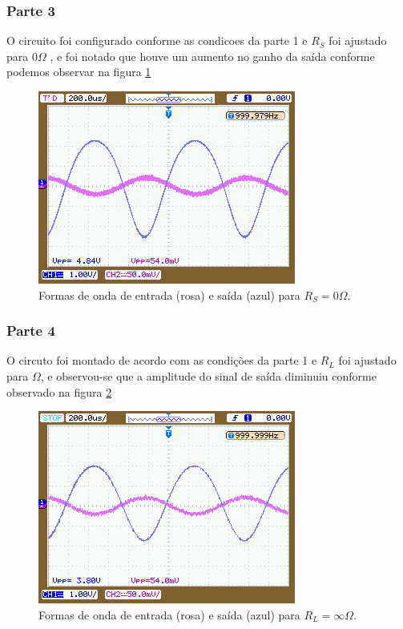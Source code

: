 \documentclass{abntex2}
\begin{document}
\subsubsection{Parte 3}

  O circuito foi configurado conforme as condicoes da parte 1 e $R_S$ foi ajustado para 0$\Omega$ , e foi notado que houve um aumento no ganho da saída conforme podemos observar na figura \ref{fig:saida_rs}

  \begin{figure}[h]
    \centering
    \includegraphics[scale = 0.5]{saida_rs.png}
    \caption{Formas de onda de entrada (rosa) e saída (azul) para $R_S = 0 \Omega$.}
    \label{fig:saida_rs}
  \end{figure}

\subsubsection{Parte 4}
  O circuto foi montado de acordo com as condições da parte 1 e $R_L$ foi ajustado para \infty$\Omega$, e observou-se que a amplitude do sinal de saída diminuiu conforme observado na figura \ref{fig:saida_rl}

  \begin{figure}[h]
    \centering
    \includegraphics[scale = 0.5]{saida_rl.png}
    \caption{Formas de onda de entrada (rosa) e saída (azul) para $R_L = \infty \Omega$.}
    \label{fig:saida_rl}
  \end{figure}
\end{document}
